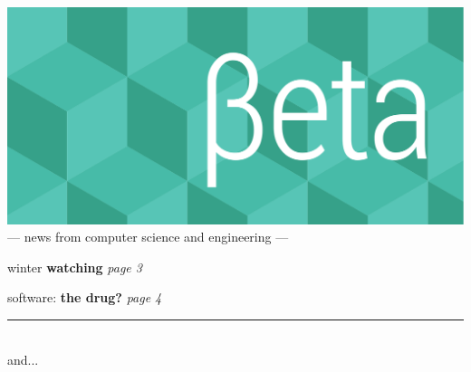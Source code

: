 \documentclass[twoside]{article}
\date{25 May 2015}
\begin{document}
\thispagestyle{empty}
\begingroup%
\vspace*{-3.5cm}\centering\hspace*{-2.8cm}%
\includegraphics[trim=0mm 20mm 0mm 0mm, clip, width=22cm]{../../style/beta-logo.pdf}%
\vspace{1em}
{\sffamily\fontsize{32pt}{32pt}\selectfont --- news from computer science and engineering ---}
\endgroup\vspace*{3ex}

\vfill\center
{\sffamily\fontsize{48pt}{48pt}\selectfont winter {\bfseries watching}}%
\hfill{\rmfamily\fontsize{14pt}{14pt}\selectfont\it page 3}
\endcenter

\vfill\center
{\sffamily\fontsize{48pt}{48pt}\selectfont software: {\bfseries the drug?}}%
\hfill{\rmfamily\fontsize{14pt}{14pt}\selectfont\it page 4}
\endcenter

\vfill\center\rule[4pt]{0.75\linewidth}{0.75pt}\\ {\sffamily\fontsize{24pt}{24pt}\selectfont and...}\endcenter
\end{document}
